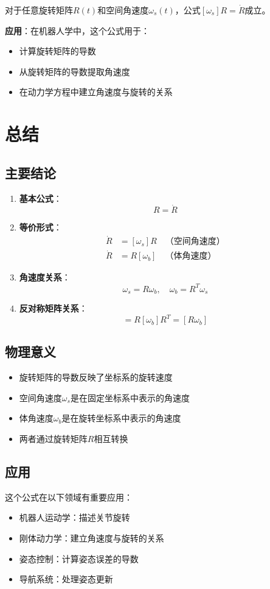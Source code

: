 \documentclass[12pt,a4paper]{article}
\begin{document}
对于任意旋转矩阵$R(t)$和空间角速度$\omega_s(t)$，公式$[\omega_s] R = \dot{R}$成立。

\textbf{应用}：在机器人学中，这个公式用于：
\begin{itemize}
\item 计算旋转矩阵的导数
\item 从旋转矩阵的导数提取角速度
\item 在动力学方程中建立角速度与旋转的关系
\end{itemize}

\section{总结}

\subsection{主要结论}

\begin{enumerate}
\item \textbf{基本公式}：
\begin{equation}
[\omega_s] R = \dot{R}
\end{equation}

\item \textbf{等价形式}：
\begin{align}
\dot{R} &= [\omega_s] R \quad \text{（空间角速度）} \\
\dot{R} &= R [\omega_b] \quad \text{（体角速度）}
\end{align}

\item \textbf{角速度关系}：
\begin{equation}
\omega_s = R \omega_b, \quad \omega_b = R^T \omega_s
\end{equation}

\item \textbf{反对称矩阵关系}：
\begin{equation}
[\omega_s] = R [\omega_b] R^T = [R \omega_b]
\end{equation}
\end{enumerate}

\subsection{物理意义}

\begin{itemize}
\item 旋转矩阵的导数反映了坐标系的旋转速度
\item 空间角速度$\omega_s$是在固定坐标系中表示的角速度
\item 体角速度$\omega_b$是在旋转坐标系中表示的角速度
\item 两者通过旋转矩阵$R$相互转换
\end{itemize}

\subsection{应用}

这个公式在以下领域有重要应用：
\begin{itemize}
\item 机器人运动学：描述关节旋转
\item 刚体动力学：建立角速度与旋转的关系
\item 姿态控制：计算姿态误差的导数
\item 导航系统：处理姿态更新
\end{itemize}
\end{document}
